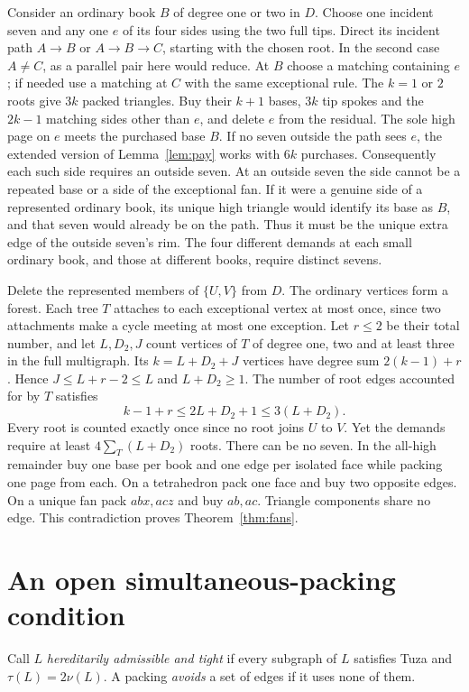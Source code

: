 \documentclass[11pt,a4paper]{amsart}
\begin{document}
Consider an ordinary book $B$ of degree one or two in $D$.
Choose one incident seven and any one $e$ of its four sides
using the two full tips. Direct its incident path $A\to B$ or
$A\to B\to C$, starting with the chosen root. In the second
case $A\ne C$, as a parallel pair here would reduce. At $B$
choose a matching containing $e$; if needed use a matching at
$C$ with the same exceptional rule. The $k=1$ or $2$ roots
give $3k$ packed triangles. Buy their $k+1$ bases, $3k$ tip
spokes and the $2k-1$ matching sides other than $e$, and delete
$e$ from the residual. The sole high page on $e$ meets the
purchased base $B$. If no seven outside the path sees $e$, the
extended version of Lemma~\ref{lem:pay} works with $6k$
purchases. Consequently each such side requires an outside
seven. At an outside seven the side cannot be a repeated base
or a side of the exceptional fan. If it were a genuine side of
a represented ordinary book, its unique high triangle would
identify its base as $B$, and that seven would already be on
the path. Thus it must be the unique extra edge of the outside
seven's rim. The four different demands at each small ordinary
book, and those at different books, require distinct sevens.

Delete the represented members of $\{U,V\}$ from $D$. The
ordinary vertices form a forest. Each tree $T$ attaches to each
exceptional vertex at most once, since two attachments make a
cycle meeting at most one exception. Let $r\le2$ be their total
number, and let $L,D_2,J$ count vertices of $T$ of degree one,
two and at least three in the full multigraph. Its $k=L+D_2+J$
vertices have degree sum $2(k-1)+r$. Hence $J\le L+r-2\le L$
and $L+D_2\ge1$. The number of root edges accounted for by $T$
satisfies
\[
 k-1+r\le2L+D_2+1\le3(L+D_2).
\]
Every root is counted exactly once since no root joins $U$ to
$V$. Yet the demands require at least $4\sum_T(L+D_2)$ roots.
There can be no seven. In the all-high remainder buy one base
per book and one edge per isolated face while packing one page
from each. On a tetrahedron pack one face and buy two opposite
edges. On a unique fan pack $abx,acz$ and buy $ab,ac$.
Triangle components share no edge. This contradiction proves
Theorem~\ref{thm:fans}.

\section{An open simultaneous-packing condition}\label{sec:four}
Call $L$ \emph{hereditarily admissible and tight} if every
subgraph of $L$ satisfies Tuza and $\tau(L)=2\nu(L)$.
A packing \emph{avoids} a set of edges if it uses none of them.
\end{document}
